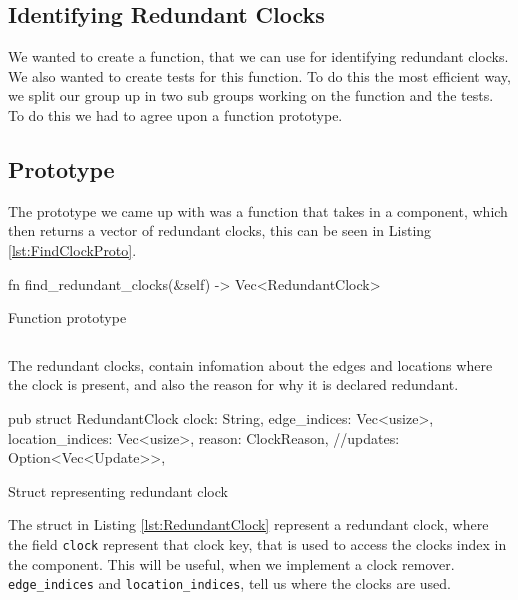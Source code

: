\subsection{Identifying Redundant Clocks}
We wanted to create a function, that we can use for identifying redundant clocks. We also wanted to create tests for this function. To do this the most efficient way, we split our group up in two sub groups working on the function and the tests. To do this we had to agree upon a function prototype. 

\subsection{Prototype}

The prototype we came up with was a function that takes in a component, which then returns a vector of redundant clocks, this can be seen in Listing \ref{lst:FindClockProto}. 

\begin{listing}
    \begin{rustcode}
        fn find_redundant_clocks(&self) -> Vec<RedundantClock> 
    \end{rustcode}
    \caption{Function prototype}
    \label{lst:FindClockProto}
\end{listing}
\begin{verbatim}
\end{verbatim}

The redundant clocks, contain infomation about the edges and locations where the clock is present, and also the reason for why it is declared redundant.

\begin{listing}
    \begin{rustcode}
    pub struct RedundantClock {
        clock: String,
        edge_indices: Vec<usize>,
        location_indices: Vec<usize>,
        reason: ClockReason,
        //updates: Option<Vec<Update>>,
    }
    \end{rustcode}
    \caption{Struct representing redundant clock}
    \label{lst:RedundantClock}
\end{listing}

The struct in Listing \ref{lst:RedundantClock} represent a redundant clock, where the field \texttt{clock} represent that clock key, that is used to access the clocks index in the component. This will be useful, when we implement a clock remover. \texttt{edge\_indices} and \texttt{location\_indices}, tell us where the clocks are used. 

